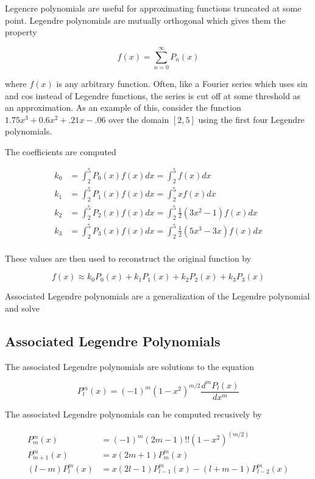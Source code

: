 \documentclass{article}
\numberwithin{equation}{subsection}
\begin{document}
Legencre polynomials are useful for approximating functions truncated at some point. Legendre polynomials are mutually orthogonal which gives them the property

\begin{equation}
f(x) = \sum_{n=0}^\infty P_n(x)
\end{equation}

where $f(x)$ is any arbitrary function. Often, like a Fourier series which uses sin and cos instead of Legendre functions, the series is cut off at some threshold as an approximation. As an example of this, consider the function $1.75x^3 + 0.6x^2+.21x-.06$ over the domain $[2,5]$ using the first four Legendre polynomials.

The coefficients are computed

\begin{align}
k_0 &= \int_2^5 P_0(x) f(x) dx = \int_2^5  f(x) dx\\
k_1 &= \int_2^5 P_1(x) f(x) dx = \int_2^5 x f(x) dx\\
k_2 &= \int_2^5 P_2(x) f(x) dx = \int_2^5 \frac{1}{2}(3x^2-1) f(x) dx\\
k_3 &= \int_2^5 P_3(x) f(x) dx = \int_2^5 \frac{1}{2}(5x^3 - 3x) f(x) dx\\
\end{align}

These values are then used to reconstruct the original function by

\begin{equation}
f(x) \approx k_0 P_0(x) + k_1 P_1(x) + k_2 P_2(x) + k_3 P_3(x)
\end{equation}


Associated Legendre polynomials are a generalization of the Legendre polynomial and solve 

\subsection{Associated Legendre Polynomials}\label{sec:assoc_leg}

The associated Legendre polynomials are solutions to the equation 

\begin{equation}
P_l^m(x) = (-1)^m(1-x^2)^{m/2}\frac{d^m P_l(x)}{dx^m}
\end{equation}

The associated Legendre polynomials can be computed recusively by

\begin{align}
P_m^m(x) &= (-1)^m(2m-1)!!(1-x^2)^(m/2) \\
P_{m+1}^m(x) &= x(2m+1)P_m^m(x) \\
(l-m) P_l^m(x) &= x(2l-1)P_{l-1}^m(x) - (l+m-1)P_{l-2}^m(x)
\end{align}
\end{document}
